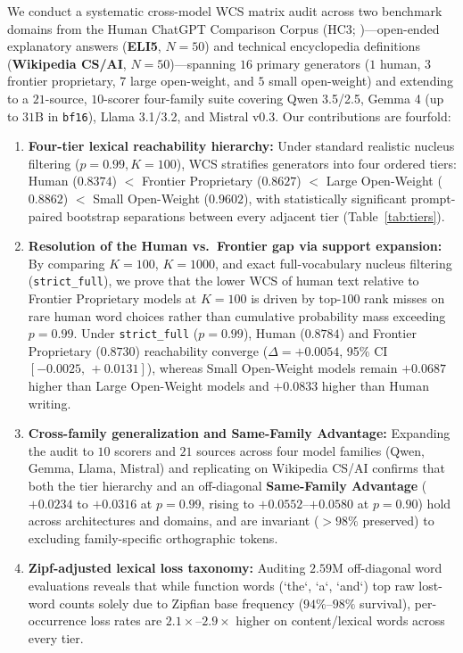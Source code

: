 \documentclass[11pt]{article}
\begin{document}
We conduct a systematic cross-model WCS matrix audit across two benchmark domains from the Human ChatGPT Comparison Corpus (HC3; \citealp{guo2023hc3})—open-ended explanatory answers (\textbf{ELI5}, $N=50$) and technical encyclopedia definitions (\textbf{Wikipedia CS/AI}, $N=50$)—spanning $16$ primary generators ($1$ human, $3$ frontier proprietary, $7$ large open-weight, and $5$ small open-weight) and extending to a $21$-source, $10$-scorer four-family suite covering Qwen 3.5/2.5, Gemma 4 (up to $31\text{B}$ in \texttt{bf16}), Llama 3.1/3.2, and Mistral v0.3. Our contributions are fourfold:
\begin{enumerate}
    \item \textbf{Four-tier lexical reachability hierarchy:} Under standard realistic nucleus filtering ($p=0.99, K=100$), WCS stratifies generators into four ordered tiers: Human ($0.8374$) $<$ Frontier Proprietary ($0.8627$) $<$ Large Open-Weight ($0.8862$) $<$ Small Open-Weight ($0.9602$), with statistically significant prompt-paired bootstrap separations between every adjacent tier (Table~\ref{tab:tiers}).
    \item \textbf{Resolution of the Human vs.\ Frontier gap via support expansion:} By comparing $K=100$, $K=1000$, and exact full-vocabulary nucleus filtering (\texttt{strict\_full}), we prove that the lower WCS of human text relative to Frontier Proprietary models at $K=100$ is driven by top-$100$ rank misses on rare human word choices rather than cumulative probability mass exceeding $p=0.99$. Under \texttt{strict\_full} ($p=0.99$), Human ($0.8784$) and Frontier Proprietary ($0.8730$) reachability converge ($\Delta = +0.0054$, 95\% CI $[-0.0025,\,+0.0131]$), whereas Small Open-Weight models remain $+0.0687$ higher than Large Open-Weight models and $+0.0833$ higher than Human writing.
    \item \textbf{Cross-family generalization and Same-Family Advantage:} Expanding the audit to $10$ scorers and $21$ sources across four model families (Qwen, Gemma, Llama, Mistral) and replicating on Wikipedia CS/AI confirms that both the tier hierarchy and an off-diagonal \textbf{Same-Family Advantage} ($+0.0234$ to $+0.0316$ at $p=0.99$, rising to $+0.0552$--$+0.0580$ at $p=0.90$) hold across architectures and domains, and are invariant ($>98\%$ preserved) to excluding family-specific orthographic tokens.
    \item \textbf{Zipf-adjusted lexical loss taxonomy:} Auditing $2.59\text{M}$ off-diagonal word evaluations reveals that while function words (`the`, `a`, `and`) top raw lost-word counts solely due to Zipfian base frequency ($94\%$--$98\%$ survival), per-occurrence loss rates are $2.1\times$--$2.9\times$ higher on content/lexical words across every tier.
\end{enumerate}
\end{document}
